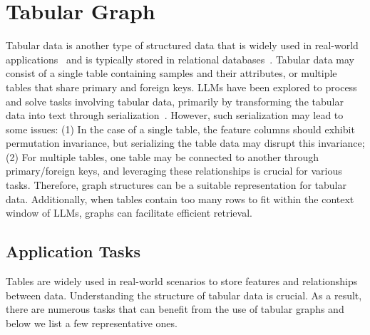 \section{Tabular Graph \texorpdfstring{\emojitabtitle}{Tabular Graph}}
\label{sec-tab}

Tabular data is another type of structured data that is widely used in real-world applications~\citep{sahakyan2021explainable} and is typically stored in relational databases~\citep{codd2007relational}. Tabular data may consist of a single table containing samples and their attributes, or multiple tables that share primary and foreign keys. LLMs have been explored to process and solve tasks involving tabular data, primarily by transforming the tabular data into text through serialization~\citep{fang2024large, singha2023tabular}. However, such serialization may lead to some issues: (1) In the case of a single table, the feature columns should exhibit permutation invariance, but serializing the table data may disrupt this invariance; (2) For multiple tables, one table may be connected to another through primary/foreign keys, and leveraging these relationships is crucial for various tasks. Therefore, graph structures can be a suitable representation for tabular data. Additionally, when tables contain too many rows to fit within the context window of LLMs, graphs can facilitate efficient retrieval.

\subsection{Application Tasks}
Tables are widely used in real-world scenarios to store features and relationships between data. Understanding the structure of tabular data is crucial. As a result, there are numerous tasks that can benefit from the use of tabular graphs and below we list a few representative ones. 


